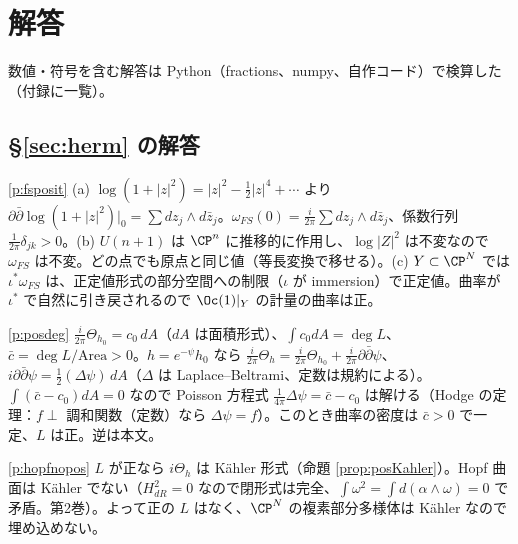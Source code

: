 
\section*{解答}\label{sec:sol}
数値・符号を含む解答は Python（fractions、numpy、自作コード）で検算した（付録に一覧）。

\subsection*{\S\ref{sec:herm} の解答}
\begin{sol}{\ref{p:fsposit}}
(a) $\log(1+|z|^2)=|z|^2-\frac12|z|^4+\cdots$ より $\partial\bar\partial\log(1+|z|^2)|_0=\sum dz_j\wedge d\bar z_j$。$\omega_{FS}(0)=\frac i{2\pi}\sum dz_j\wedge d\bar z_j$、係数行列 $\frac1{2\pi}\delta_{jk}>0$。(b) $U(n+1)$ は $\CP^n$ に推移的に作用し、$\log|Z|^2$ は不変なので $\omega_{FS}$ は不変。どの点でも原点と同じ値（等長変換で移せる）。(c) $Y\subset\CP^N$ では $\iota^*\omega_{FS}$ は、正定値形式の部分空間への制限（$\iota$ が immersion）で正定値。曲率が $\iota^*$ で自然に引き戻されるので $\Oc(1)|_Y$ の計量の曲率は正。
\end{sol}
\begin{sol}{\ref{p:posdeg}}
$\frac i{2\pi}\Theta_{h_0}=c_0\,dA$（$dA$ は面積形式）、$\int c_0dA=\deg L$、$\bar c=\deg L/\mathrm{Area}>0$。$h=e^{-\psi}h_0$ なら $\frac i{2\pi}\Theta_h=\frac i{2\pi}\Theta_{h_0}+\frac i{2\pi}\partial\bar\partial\psi$、$i\partial\bar\partial\psi=\frac12(\Delta\psi)\,dA$（$\Delta$ は Laplace--Beltrami、定数は規約による）。$\int(\bar c-c_0)dA=0$ なので Poisson 方程式 $\frac1{4\pi}\Delta\psi=\bar c-c_0$ は解ける（Hodge の定理：$f\perp$ 調和関数（定数）なら $\Delta\psi=f$）。このとき曲率の密度は $\bar c>0$ で一定、$L$ は正。逆は本文。
\end{sol}
\begin{sol}{\ref{p:hopfnopos}}
$L$ が正なら $i\Theta_h$ は Kähler 形式（命題 \ref{prop:posKahler}）。Hopf 曲面は Kähler でない（$H^2_{dR}=0$ なので閉形式は完全、$\int\omega^2=\int d(\alpha\wedge\omega)=0$ で矛盾。第2巻）。よって正の $L$ はなく、$\CP^N$ の複素部分多様体は Kähler なので埋め込めない。
\end{sol}

